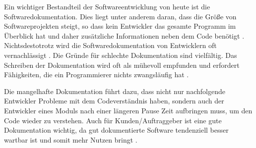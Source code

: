 \label{sec:introduction}

Ein wichtiger Bestandteil der Softwareentwicklung von heute ist die Softwaredokumentation. Dies liegt unter anderem daran, dass die Größe von Softwareprojekten steigt, so dass kein Entwickler das gesamte Programm im Überblick hat und daher zusätzliche Informationen neben dem Code benötigt \cite[S. 1]{StaticAnalysis:AnIntroduction:TheFundamentalChallengeofSoftwareEngineeringisOneofComplexity.}. Nichtsdestotrotz wird die Softwaredokumentation von Entwicklern oft vernachlässigt \cite[S. 83]{Qualityanalysisofsourcecodecomments}.  Die Gründe für schlechte Dokumentation sind vielfältig. Das Schreiben der Dokumentation wird oft als mühevoll empfunden und erfordert Fähigkeiten, die ein Programmierer nichts zwangsläufig hat\cite[S. 70]{AutomaticQualityAssessmentofSourceCodeComments:TheJavadocMiner} \cite[S. 25]{CommentingonCodeConsideringDatasBottleneck}.  

Die mangelhafte Dokumentation führt dazu, dass nicht nur nachfolgende Entwickler Probleme mit dem Codeverständnis haben, sondern auch der Entwickler eines Moduls nach einer längeren Pause Zeit aufbringen muss, um den Code wieder zu verstehen. Auch für Kunden/Auftraggeber ist eine gute Dokumentation wichtig, da gut dokumentierte Software tendenziell besser wartbar ist und somit mehr Nutzen bringt \cite[S. 83]{Qualityanalysisofsourcecodecomments}\cite[S. 1]{SoftwareDocumentationManagementIssuesandPractices:ASurvey}.




